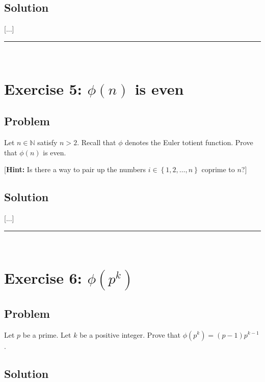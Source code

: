 \documentclass[paper=a4, fontsize=12pt]{scrartcl} %
\newcommand{\NN}{\mathbb{N}} %
\newcommand{\set}[1]{\left\{ #1 \right\}}
\newcommand{\tup}[1]{\left( #1 \right)}
\newcommand{\horrule}[1]{\rule{\linewidth}{#1}} %
\theoremstyle{plainsl}
\theoremstyle{definition}
\theoremstyle{remark}
\begin{document}
\subsection{Solution}

[...]

\horrule{0.3pt} \\[0.4cm]

\section{Exercise 5: $\phi\tup{n}$ is even}

\subsection{Problem}

Let $n \in \NN$ satisfy $n > 2$.
Recall that $\phi$ denotes the Euler totient function.
Prove that $\phi\tup{n}$ is even.

[\textbf{Hint:} Is there a way to pair up the numbers
$i \in \set{1, 2, \ldots, n}$ coprime to $n$?]

\subsection{Solution}

[...]

\horrule{0.3pt} \\[0.4cm]

\section{Exercise 6: $\phi\tup{p^k}$}

\subsection{Problem}

Let $p$ be a prime.
Let $k$ be a positive integer.
Prove that $\phi\tup{p^k} = \tup{p-1} p^{k-1}$.

\subsection{Solution}
\end{document}
